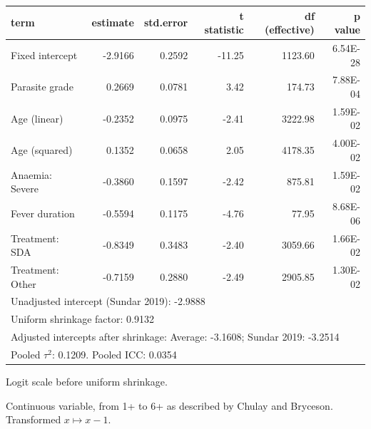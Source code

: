 \begin{table}[tb]
  \centering
  \begin{threeparttable}
    \begin{tabular}{lrrrrr}
      \toprule
      term                      & estimate\tnote{1} & std.error & t statistic & df (effective) & p value  \\
      \midrule
      Fixed intercept           & -2.9166           & 0.2592    & -11.25      & 1123.60        & 6.54E-28 \\
      Parasite grade\tnote{2}   & 0.2669            & 0.0781    & 3.42        & 174.73         & 7.88E-04 \\
      Age (linear)\tnote{3}     & -0.2352           & 0.0975    & -2.41       & 3222.98        & 1.59E-02 \\
      Age (squared)\tnote{3}    & 0.1352            & 0.0658    & 2.05        & 4178.35        & 4.00E-02 \\
      Anaemia: Severe\tnote{4}  & -0.3860           & 0.1597    & -2.42       & 875.81         & 1.59E-02 \\
      Fever duration\tnote{5}   & -0.5594           & 0.1175    & -4.76       & 77.95          & 8.68E-06 \\
      Treatment: SDA\tnote{6}   & -0.8349           & 0.3483    & -2.40       & 3059.66        & 1.66E-02 \\
      Treatment: Other\tnote{6} & -0.7159           & 0.2880    & -2.49       & 2905.85        & 1.30E-02 \\
      \midrule
      \multicolumn{6}{l}{Unadjusted intercept (Sundar 2019): -2.9888}                                     \\
      \midrule
      \multicolumn{6}{l}{Uniform shrinkage factor: 0.9132}                                                \\
      \midrule
      \multicolumn{6}{l}{Adjusted intercepts after shrinkage: Average: -3.1608; Sundar 2019: -3.2514}     \\
      \midrule
      \multicolumn{6}{l}{Pooled $\tau^2$: 0.1209. Pooled ICC: 0.0354}                                     \\
      \bottomrule
    \end{tabular}
    \begin{tablenotes}
      \footnotesize
      \item[1] Logit scale before uniform shrinkage.
      \item[2] Continuous variable, from 1+ to 6+ as described by Chulay and Bryceson\cite{chulay1983}. Transformed $x \mapsto x - 1$.

\end{tablenotes}
\end{threeparttable}
\end{table}
